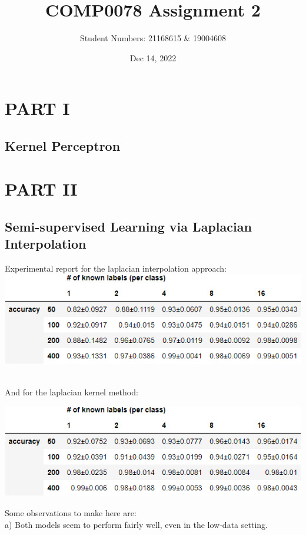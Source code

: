 \documentclass[12pt]{article}
\title{\textbf{COMP0078 Assignment 2}}
\author{Student Numbers: 21168615 \& 19004608 \\ }
\date{Dec 14, 2022}
\begin{document}
    \maketitle
\section{PART I}
\subsection{Kernel Perceptron}
\newpage
\section{PART II}
\subsection{Semi-supervised Learning via Laplacian Interpolation}

Experimental report for the laplacian interpolation approach:
\\

\includegraphics{outputs/part2/laplacian_interpolation_report.png}

\\

And for the laplacian kernel method:

\includegraphics{outputs/part2/laplacian_kernel_interpolation_report.png}

Some observations to make here are:\\


a) Both models seem to perform fairly well, even in the low-data setting.\\
\end{document}
